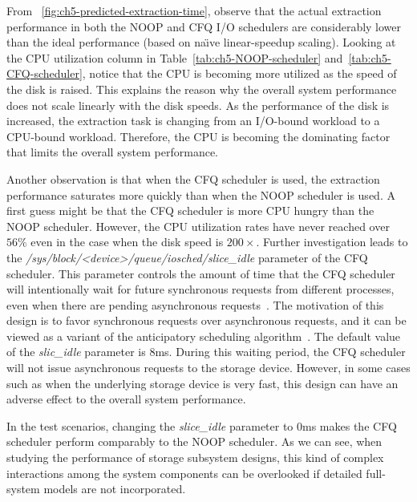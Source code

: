 From ~\ref{fig:ch5-predicted-extraction-time}, observe that the actual extraction performance in both the NOOP and CFQ I/O schedulers are considerably lower than the ideal performance (based on na\"{\i}ve linear-speedup scaling). Looking at the CPU utilization column in Table~\ref{tab:ch5-NOOP-scheduler} and~\ref{tab:ch5-CFQ-scheduler}, notice that the CPU is becoming more utilized as the speed of the disk is raised. This explains the reason why the overall system performance does not scale linearly with the disk speeds. As the performance of the disk is increased, the extraction task is changing from an I/O-bound workload to a CPU-bound workload. Therefore, the CPU is becoming the dominating factor that limits the overall system performance.

Another observation is that when the CFQ scheduler is used, the extraction performance saturates more quickly than when the NOOP scheduler is used. A first guess might be that the CFQ scheduler is more CPU hungry than the NOOP scheduler. However, the CPU utilization rates have never reached over $56\%$ even in the case when the disk speed is $200\times$. Further investigation leads to the \textit{/sys\slash block\slash <device>\slash queue\slash iosched\slash slice_idle} %
parameter of the CFQ scheduler. This parameter controls the amount of time that the CFQ scheduler will intentionally wait for future synchronous requests from different processes, even when there are pending asynchronous requests~\cite{Layton:2009}. The motivation of this design is to favor synchronous requests over asynchronous requests, and it can be viewed as a variant of the anticipatory scheduling algorithm~\cite{Iyer:2001}. The default value of the \textit{slic_idle} parameter is 8\si{\milli\second}. During this waiting period, the CFQ scheduler will not issue asynchronous requests to the storage device. However, in some cases such as when the underlying storage device is very fast, this design can have an adverse effect to the overall system performance.

In the test scenarios, changing the \textit{slice_idle} parameter to 0\si{\milli\second} makes the CFQ scheduler perform comparably to the NOOP scheduler. As we can see, when studying the performance of storage subsystem designs, this kind of complex interactions among the system components can be overlooked if detailed full-system models are not incorporated.

